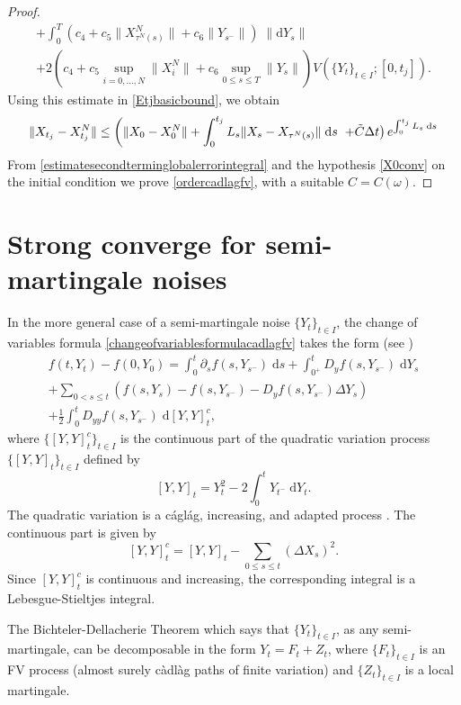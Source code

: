 \documentclass[reqno,12pt]{amsart}
\theoremstyle{plain} %
\theoremstyle{definition} %
\begin{document}
\begin{proof}
\begin{multline}
        + \int_0^T \left(c_4 + c_5 \|X_{\tau^N(s)}^N\| + c_6\|Y_{s^-}\|\right)\;\|\mathrm{d}Y_s\| \\
        + 2\left(c_4 + c_5\sup_{i=0, \ldots, N}\|X_i^N\| + c_6\sup_{0\leq s \leq T}\|Y_s\|\right) V(\{Y_t\}_{t\in I}; [0, t_j]).
    \end{multline}
    Using this estimate in \eqref{Etjbasicbound}, we obtain
    \[
        \|X_{t_j} - X_{t_j}^N\| \leq \left( \|X_0 - X_0^N\| + \int_0^{t_j} L_s\|X_s - X_{\tau^N(s)}\| \;\mathrm{d}s \right. \\
            \left. + \tilde C \Delta t\right) e^{\int_0^{t_j} L_s\;\mathrm{d}s}
    \]
    From \eqref{estimatesecondterminglobalerrorintegral} and the hypothesis \eqref{X0conv} on the initial condition we prove \eqref{ordercadlagfv}, with a suitable $C=C(\omega)$.
\end{proof}

\section{Strong converge for semi-martingale noises}
\label{secsubmartingale}

In the more general case of a semi-martingale noise $\{Y_t\}_{t\in I}$, the change of variables formula \eqref{changeofvariablesformulacadlagfv} takes the form (see \cite[Theorems 31 and 33]{Protter2005})
\begin{multline}
    \label{changeofvariablesformulasemimartingale}
    f(t, Y_t) - f(0, Y_0) = \int_0^t \partial_s f(s, Y_{s^-})\;\mathrm{d}s + \int_{0^+}^t D_y f(s, Y_{s^-}) \;\mathrm{d}Y_s \\
    + \sum_{0 < s \leq t} \left( f(s, Y_s) - f(s, Y_{s^{-}}) - D_y f(s, Y_{s^-})\Delta Y_s\right) \\
    + \frac{1}{2}\int_0^t D_{yy}f(s, Y_{s^-})\;\mathrm{d}[Y, Y]_t^c,
\end{multline}
where $\{[Y, Y]_t^c\}_{t\in I}$ is the continuous part of the quadratic variation process $\{[Y, Y]_t\}_{t\in I}$ defined by
\[
    [Y, Y]_t = Y_t^2 - 2\int_0^t Y_{t^-} \;\mathrm{d}Y_t.
\]
The quadratic variation is a c\'agl\'ag, increasing, and adapted process \cite[Theorem 22]{Protter2005}. The continuous part is given by
\[
    [Y, Y]_t^c = [Y, Y]_t - \sum_{0\leq s \leq t} \left(\Delta X_s\right)^2.
\]
Since $[Y, Y]_t^c$ is continuous and increasing, the corresponding integral is a Lebesgue-Stieltjes integral.

The Bichteler-Dellacherie Theorem \cite[Theorem 47]{Protter2005} which says that $\{Y_t\}_{t\in I}$, as any semi-martingale, can be decomposable in the form $Y_t = F_t + Z_t$, where $\{F_t\}_{t\in I}$ is an FV process (almost surely c\`adl\`ag paths of finite variation) and $\{Z_t\}_{t\in I}$ is a local martingale.
\end{document}
